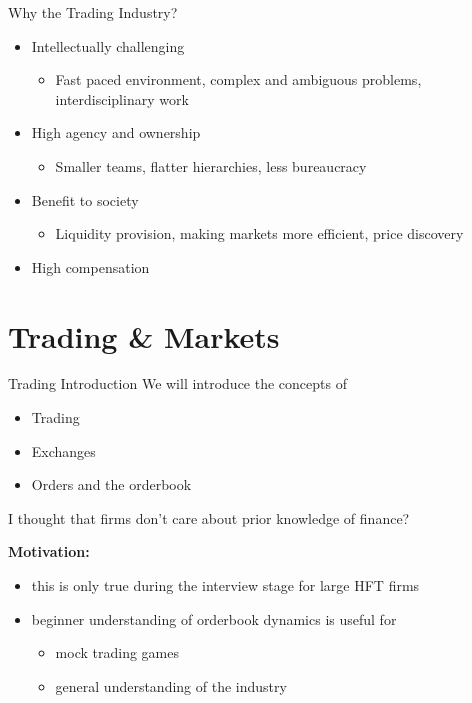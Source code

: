 \begin{frame}{Why the Trading Industry?}
  \begin{itemize}
    \item Intellectually challenging
    \begin{itemize}
      \item Fast paced environment, complex and ambiguous problems, interdisciplinary work
    \end{itemize}
    \item High agency and ownership
    \begin{itemize}
      \item Smaller teams, flatter hierarchies, less bureaucracy
    \end{itemize}
    \item Benefit to society 
    \begin{itemize}
      \item Liquidity provision, making markets more efficient, price discovery
    \end{itemize}
    \item High compensation
  \end{itemize}
\end{frame}

\section{Trading \& Markets}

\begin{frame}{Trading Introduction}
  We will introduce the concepts of
  \begin{itemize}
    \item Trading
    \item Exchanges
    \item Orders and the orderbook
  \end{itemize}

  \vspace{0.3cm}

  \textcolor{sqt-question}{
    I thought that firms don't care about prior knowledge of finance?
  }

  \vspace{0.3cm}

  \textbf{Motivation:}
  \begin{itemize}
    \item this is only true during the interview stage for large HFT firms
    \item beginner understanding of orderbook dynamics is useful for
    \begin{itemize}
      \item mock trading games
      \item general understanding of the industry
    \end{itemize}
  \end{itemize}
\end{frame}


